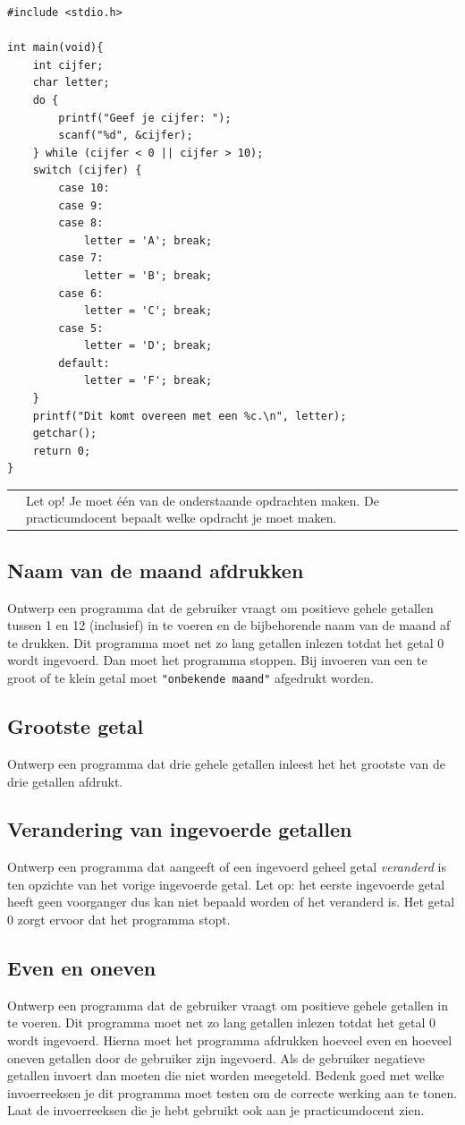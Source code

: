 \documentclass[a4paper,10pt,fleqn,twoside]{article}
\newcommand{\letop}{%
\vspace*{2ex}
\begin{mdframed}[outerlinewidth = 1 ,%
roundcorner = 4 pt,%
leftmargin = 40,%
rightmargin = 40,%
backgroundcolor = yellow!40,%
outerlinecolor = red!70!black,%
innertopmargin = \topskip,%
splittopskip = \topskip,%
]
\begin{tabularx}{\linewidth}{m{1cm}X}
\Large\leftpointright & Let op! Je moet één van de onderstaande opdrachten maken. De practicumdocent bepaalt welke opdracht je moet maken.
\end{tabularx}
\end{mdframed}
}
\begin{document}
\begin{lstlisting}
#include <stdio.h>

int main(void){
    int cijfer;
    char letter;
    do {
        printf("Geef je cijfer: ");
        scanf("%d", &cijfer);
    } while (cijfer < 0 || cijfer > 10);
    switch (cijfer) {
        case 10:
        case 9:
        case 8:
            letter = 'A'; break;
        case 7: 
            letter = 'B'; break;
        case 6: 
            letter = 'C'; break;
        case 5:
            letter = 'D'; break;
        default:
            letter = 'F'; break;
    }
    printf("Dit komt overeen met een %c.\n", letter);
    getchar();
    return 0;
}
\end{lstlisting}

\letop

\subsection{Naam van de maand afdrukken}
Ontwerp een programma dat de gebruiker vraagt om positieve gehele getallen tussen 1 en 12 (inclusief) in te voeren en de bijbehorende naam van de maand af te drukken. Dit programma moet net zo lang getallen inlezen totdat het getal 0 wordt ingevoerd. Dan moet het programma stoppen. Bij invoeren van een te groot of te klein getal moet \lstinline|"onbekende maand"| afgedrukt worden. 
 
\subsection{Grootste getal}
Ontwerp een programma dat drie gehele getallen inleest het het grootste van de drie getallen afdrukt.
 
\subsection{Verandering van ingevoerde getallen}
Ontwerp een programma dat aangeeft of een ingevoerd geheel getal \textsl{veranderd} is ten opzichte van het vorige ingevoerde getal. Let op: het eerste ingevoerde getal heeft geen voorganger dus kan niet bepaald worden of het veranderd is. Het getal 0 zorgt ervoor dat het programma stopt.


\subsection{Even en oneven}
Ontwerp een programma dat de gebruiker vraagt om positieve gehele getallen in te voeren. Dit programma moet net zo lang getallen inlezen totdat het getal 0 wordt ingevoerd. Hierna moet het programma afdrukken hoeveel even en hoeveel oneven getallen door de gebruiker zijn ingevoerd. Als de gebruiker negatieve getallen invoert dan moeten die niet worden meegeteld. Bedenk goed met welke invoerreeksen je dit programma moet testen om de correcte werking aan te tonen. Laat de invoerreeksen die je hebt gebruikt ook aan je practicumdocent zien.
\end{document}
